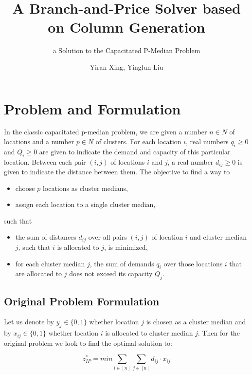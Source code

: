 \documentclass[
	11pt,
	DIV10,
	ngerman,
	a4paper,
	oneside,
	headings=normal,
	captions=tableheading,
	final,
	numbers=noenddot
]{scrartcl}
\title{A Branch-and-Price Solver based on Column Generation}
\subtitle{\vspace{0.5cm}a Solution to the Capacitated P-Median Problem}
\author{Yiran Xing, Yinglun Liu}
\begin{document}
\maketitle


\section{Problem and Formulation}
\label{sec1}

In the classic capacitated p-median problem, we are given a number $ n \in N $ of locations and a number $ p \in N $ of clusters. For each location $ i $, real numbers $ q_{i} \geq 0 $ and $ Q_{i} \geq 0 $ are given to indicate the demand and capacity of this particular location. Between each pair $ \left(i, j\right) $ of locations $ i $ and $ j $, a real number $ d_{ij} \geq 0 $ is given to indicate the distance between them. The objective to find a way to

\begin{itemize}
	\item choose $ p $ locations as cluster medians,
	\item assign each location to a single cluster median,
\end{itemize}

such that

\begin{itemize}
    \item the sum of distances $ d_{ij} $ over all pairs $ \left(i, j\right) $ of location $ i $ and cluster median $ j $, such that $ i $ is allocated to $ j $, is minimized,
    \item for each cluster median $ j $, the sum of demands $ q_{i} $ over those locations $ i $ that are allocated to $ j $ does not exceed its capacity $ Q_{j} $.
\end{itemize}

\subsection{Original Problem Formulation}

Let us denote by $ y_{j} \in \{0, 1\} $ whether location $ j $ is chosen as a cluster median and by $ x_{ij} \in \{0, 1\} $ whether location $ i $ is allocated to cluster median $ j $. Then for the original problem we look to find the optimal solution to:

\begin{equation}
	\label{eq1}
	z_{IP}^{*} = min \sum_{i \in [n]} \sum_{j \in [n]} d_{ij} \cdot x_{ij}
\end{equation}
\end{document}
